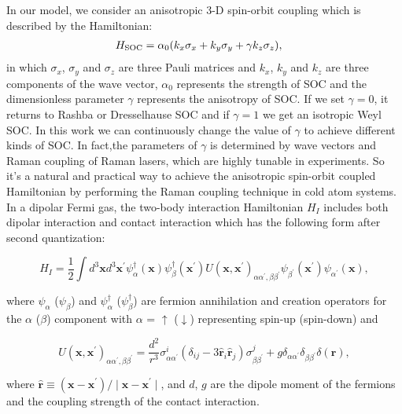 \documentclass[twocolumn,english,pra,superscriptaddress]{revtex4-1}
\begin{document}
In our model, we consider an anisotropic 3-D spin-orbit coupling which is described by the Hamiltonian:
\begin{eqnarray}
H_{\rm SOC}&=\alpha_{0} (k_{x}\sigma_{x}+k_{y}\sigma_{y}+\gamma k_{z}\sigma_{z}),
\end{eqnarray}
in which $\sigma_{x}$, $\sigma_{y}$ and $\sigma_{z}$ are three Pauli matrices and $k_{x}$, $k_{y}$ and $k_{z}$ are three components of the wave vector, $\alpha_{0}$ represents the strength of SOC and the dimensionless parameter $\gamma$ represents the anisotropy of SOC. If we set $\gamma=0$, it returns to Rashba or Dresselhause SOC and if $\gamma=1$ we get an isotropic Weyl SOC. In this work we can continuously change the value of $\gamma$ to achieve different kinds of SOC. In fact,the parameters of  $\gamma$ is determined by wave vectors and Raman coupling of Raman lasers, which are highly tunable in experiments. So it’s a natural and practical way to achieve the anisotropic spin-orbit coupled Hamiltonian by performing the Raman coupling technique in cold atom systems. In a dipolar Fermi gas, the two-body interaction Hamiltonian $H_{I}$ includes both dipolar interaction and contact interaction which has the following form after second quantization:
\begin{small}
\begin{equation}
H_{I}=\frac{1}{2}\int d^{3}\mathbf{x}d^{3}\mathbf{x^{\prime}}\psi_{\alpha}^ {\dagger}(\mathbf{x})\psi_{\beta}^{\dagger}
(\mathbf{x^{\prime}})U({\mathbf{x},\mathbf{x^{\prime}}})_{\alpha\alpha^{\prime},\beta\beta^{\prime}} \psi_{\beta^{\prime}}(\mathbf{x^{\prime}})\psi_{\alpha^{\prime}}(\mathbf{x}),
\end{equation}
\end{small}
where $\psi_{\alpha}$ ($\psi_{\beta}$) and $\psi_{\alpha}^{\dagger}$ ($\psi_{\beta}^{\dagger}$) are fermion annihilation and creation operators for the $\alpha$ ($\beta$) component with $\alpha$ = $\uparrow$ ($\downarrow$) representing spin-up (spin-down) and
\begin{small}
\begin{equation}
U({\mathbf{x},\mathbf{x^{\prime}}})_{\alpha\alpha^{\prime},\beta\beta^{\prime}}=\frac{d^{2}}{r^{3}}\sigma_{\alpha \alpha^{\prime}}^{i}(\delta_{ij}-3\hat{\mathbf{r}}_{i}\hat{\mathbf{r}}_{j})\sigma_{\beta \beta^{\prime}}^{j}+g\delta_{\alpha\alpha^{\prime}}\delta_{\beta\beta^{\prime}}\delta(\mathbf{r}),
\end{equation}
\end{small}
where $\hat{\mathbf{r}}\equiv (\mathbf{x}-\mathbf{x^{\prime}})/\mid \mathbf{x}-\mathbf{x^{\prime}}\mid$, and $d$, $g$ are the dipole moment of the fermions and the coupling strength of the contact interaction. \par
\end{document}
